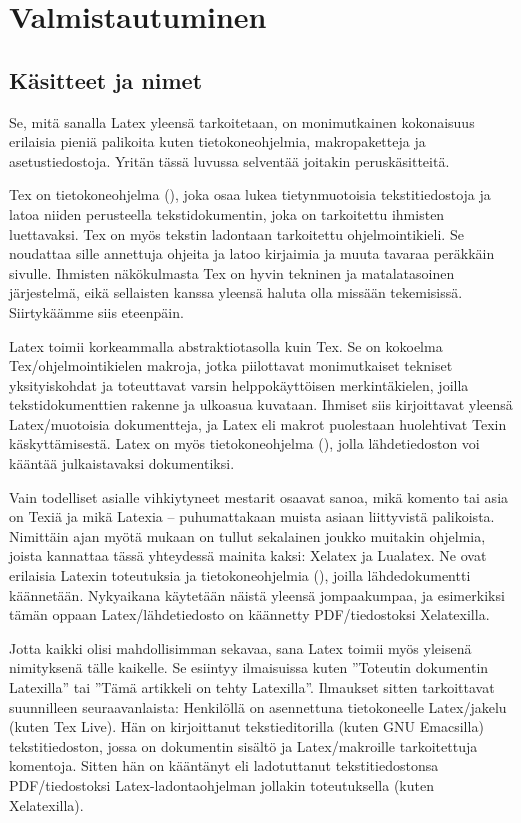 \chapter{Valmistautuminen}

\section{Käsitteet ja nimet}

Se, mitä sanalla Latex yleensä tarkoitetaan, on monimutkainen
kokonaisuus erilaisia pieniä palikoita kuten tietokone\-ohjelmia,
makropaketteja ja asetustiedostoja. Yritän tässä luvussa selventää
joitakin peruskäsitteitä.

Tex on tietokone\-ohjelma (), joka osaa lukea tietynmuotoisia
tekstitiedostoja ja latoa niiden perusteella tekstidokumentin, joka on
tarkoitettu ihmisten luettavaksi. Tex on myös tekstin ladontaan
tarkoitettu ohjelmointikieli. Se noudattaa sille annettuja ohjeita ja
latoo kirjaimia ja muuta tavaraa peräkkäin sivulle. Ihmisten
näkökulmasta Tex on hyvin tekninen ja matalatasoinen järjestelmä, eikä
sellaisten kanssa yleensä haluta olla missään tekemisissä. Siirtykäämme
siis eteenpäin.

Latex toimii korkeammalla abstraktiotasolla kuin Tex. Se on kokoelma
Tex\-/ohjelmointikielen makroja, jotka piilottavat monimutkaiset
tekniset yksityiskohdat ja toteuttavat varsin helppokäyttöisen
merkintäkielen, joilla tekstidokumenttien rakenne ja ulko\-asua
kuvataan. Ihmiset siis kirjoittavat yleensä Latex\-/muotoisia
dokumentteja, ja Latex eli makrot puolestaan huolehtivat Texin
käskyttämisestä. Latex on myös tietokone\-ohjelma (), jolla
lähdetiedoston voi kääntää julkaistavaksi dokumentiksi.

Vain todelliset asialle vihkiytyneet mestarit osaavat sanoa, mikä
komento tai asia on Texiä ja mikä Latexia -- puhumattakaan muista asiaan
liittyvistä palikoista. Nimittäin ajan myötä mukaan on tullut sekalainen
joukko muitakin ohjelmia, joista kannattaa tässä yhteydessä mainita
kaksi: Xelatex ja Lualatex. Ne ovat erilaisia Latexin toteutuksia ja
tietokone\-ohjelmia (), joilla lähdedokumentti
käännetään. Nyky\-aikana käytetään näistä yleensä jompaakumpaa, ja
esimerkiksi tämän oppaan Latex\-/lähdetiedosto on käännetty
PDF\-/tiedostoksi Xelatexilla.

Jotta kaikki olisi mahdollisimman sekavaa, sana Latex toimii myös
yleisenä nimityksenä tälle kaikelle. Se esiintyy ilmaisuissa kuten
''Toteutin dokumentin Latexilla'' tai ''Tämä artikkeli on tehty
Latexilla''. Ilmaukset sitten tarkoittavat suunnilleen seuraavanlaista:
Henkilöllä on asennettuna tietokoneelle Latex\-/jakelu (kuten Tex Live).
Hän on kirjoittanut teksti\-editorilla (kuten GNU Emacsilla)
tekstitiedoston, jossa on dokumentin sisältö ja Latex\-/makroille
tarkoitettuja komentoja. Sitten hän on kääntänyt eli ladotuttanut
tekstitiedostonsa PDF\-/tiedostoksi Latex-la\-don\-ta\-oh\-jel\-man
jollakin toteutuksella (kuten Xelatexilla).

